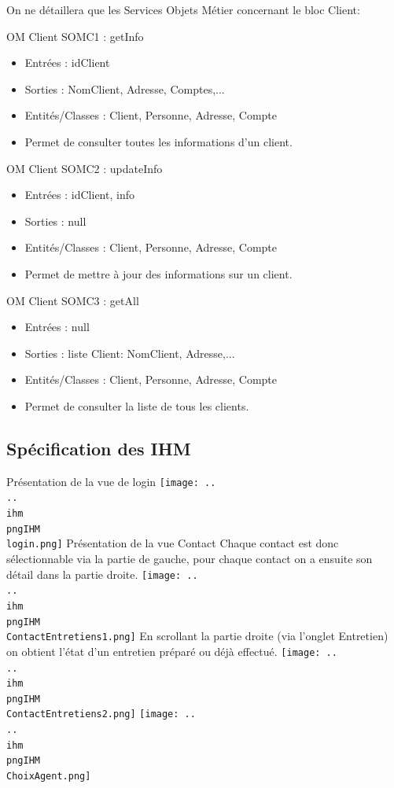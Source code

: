 On ne détaillera que les Services Objets Métier concernant le bloc Client:


OM Client SOMC1 : getInfo
\begin{itemize}
\item Entrées : idClient
\item Sorties : NomClient, Adresse, Comptes,...
\item Entités/Classes : Client, Personne, Adresse, Compte
\item Permet de consulter toutes les informations d'un client.
\end{itemize}

OM Client SOMC2 : updateInfo
\begin{itemize}
\item Entrées : idClient, info
\item Sorties : null
\item Entités/Classes : Client, Personne, Adresse, Compte
\item Permet de mettre à jour des informations sur un client.
\end{itemize}

OM Client SOMC3 : getAll
\begin{itemize}
\item Entrées : null
\item Sorties : liste Client: NomClient, Adresse,...
\item Entités/Classes : Client, Personne, Adresse, Compte
\item Permet de consulter la liste de tous les clients.
\end{itemize}

\subsection{Spécification des IHM}
Présentation de la vue de login
\texttt{[image: ..\\..\\ihm\\pngIHM\\login.png]}
Présentation de la vue Contact
Chaque contact est donc sélectionnable via la partie de gauche, pour chaque contact on a ensuite son détail dans la partie droite.
\texttt{[image: ..\\..\\ihm\\pngIHM\\ContactEntretiens1.png]}
En scrollant la partie droite (via l'onglet Entretien) on obtient l'état d'un entretien préparé ou déjà effectué.
\texttt{[image: ..\\..\\ihm\\pngIHM\\ContactEntretiens2.png]}
\texttt{[image: ..\\..\\ihm\\pngIHM\\ChoixAgent.png]}

